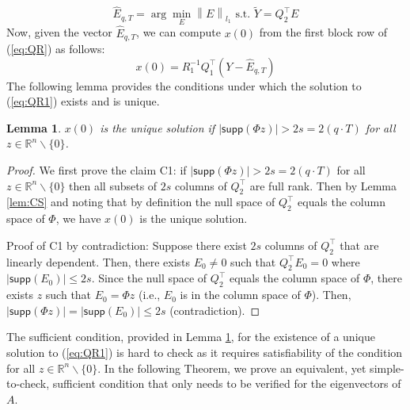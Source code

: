 \documentclass[12pt, conference, a4paper, twoside]{IEEEconf_mod}
\newcommand{\norm}[1]{\left\lVert#1\right\rVert}
\newtheorem{lem}{\bf{Lemma}}
\begin{document}
\begin{equation}
	\hat{E}_{q,T} = \arg \min_E \norm { E}_{l_1} \text{ s.t. } \tilde Y = Q_2^\top E
	\label{eq:solve_E}
\end{equation}
Now, given the vector $\hat{E}_{q,T}$, we can compute $x(0)$ from the first block row of (\ref{eq:QR}) as follows:
\begin{equation}
	x(0) = R_1^{-1} Q_1^\top (Y- \hat{E}_{q,T})
	\label{eq:QR1}
\end{equation}
The following lemma provides the conditions under which the solution to (\ref{eq:QR1}) exists and is unique.
\begin{lem} \label{lem:EC}
	$x(0) $ is the unique solution if $\lvert \textsf{supp}( \Phi z) \rvert > 2 s = 2 (q\cdot T)$ for all $z \in \mathbb{R}^n \backslash \{ 0 \}$.
\end{lem}
\begin{proof}
We first prove the claim C1: if $\lvert \textsf{supp}( \Phi z) \rvert > 2 s = 2 (q\cdot T)$ for all $z \in \mathbb{R}^n \backslash \{ 0 \}$ then all subsets of $2s$ columns of $Q_2^\top$ are full rank. Then by Lemma \ref{lem:CS} and noting that by definition the null space of $Q_2^\top$ equals the column space of $\Phi$, we have $x(0) $ is the unique solution.

Proof of C1 by contradiction: Suppose there exist $2s$ columns of $Q_2^\top$ that are linearly dependent. Then, there exists $E_0 \neq 0$ such that $Q_2^\top E_0 = 0$ where $\lvert \textsf{supp}(E_0) \rvert \le 2s$. Since the null space of $Q_2^\top$ equals the column space of $\Phi$, there exists $z$ such that $E_0 = \Phi z$ (i.e., $E_0$ is in the column space of $\Phi$). Then, $ \lvert  \textsf{supp}(\Phi z) \rvert = \lvert \textsf {supp} (E_0) \rvert \le 2s $ (contradiction).
\end{proof}

The sufficient condition, provided in Lemma \ref{lem:EC}, for the existence of a unique solution to (\ref{eq:QR1}) is hard to check as it requires satisfiability of the condition for all $z \in \mathbb{R}^n \backslash \{ 0 \}$. In the following Theorem, we prove an equivalent, yet simple-to-check, sufficient condition that only needs to be verified for the eigenvectors of $A$.
\end{document}
